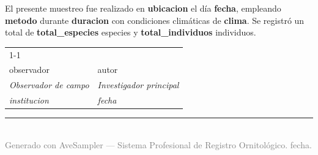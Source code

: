 \documentclass[12pt,a4paper]{article}
\begin{document}
El presente muestreo fue realizado en \textbf{{{ubicacion}}} el día \textbf{{{fecha}}},
empleando \textbf{{{metodo}}} durante \textbf{{{duracion}}} con condiciones climáticas
de \textbf{{{clima}}}. Se registró un total de \textbf{{{total_especies}}} especies
y \textbf{{{total_individuos}}} individuos.

\vspace{1.5cm}
\noindent
\begin{tabular}{p{6cm} p{6cm}}
  \cline{1-1}\cline{2-2}\\
  {{observador}}              & {{autor}} \\
  \textit{Observador de campo} & \textit{Investigador principal} \\
  \textit{{{institucion}}}   & \textit{{{fecha}}} \\
\end{tabular}

\vspace{2cm}
\noindent\textcolor{midgreen}{\rule{\textwidth}{0.3pt}}\\
\footnotesize\textcolor{gray}{Generado con AveSampler — Sistema Profesional de Registro Ornitológico. {{fecha}}.}
\end{document}
